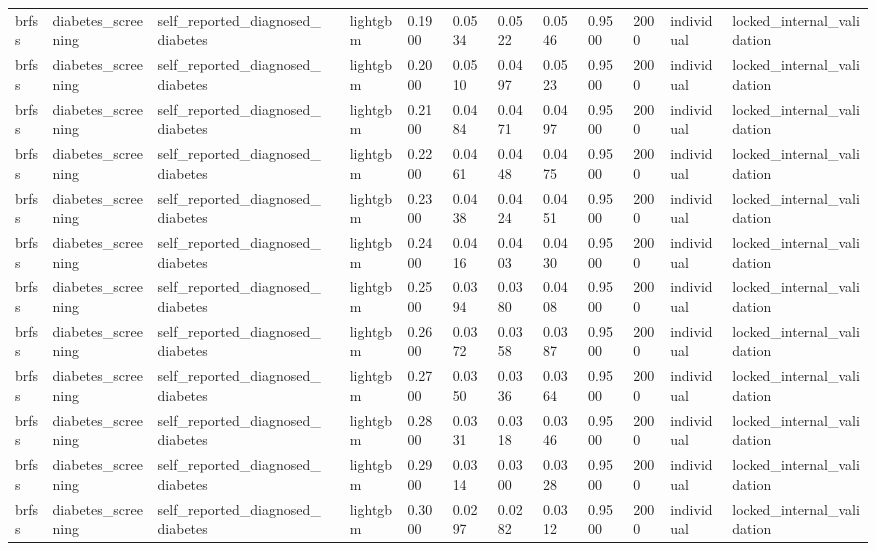 \begin{tabular}{lllllllllllll}
brfss & diabetes\_screening & self\_reported\_diagnosed\_diabetes &  & lightgbm & 0.1900 & 0.0534 & 0.0522 & 0.0546 & 0.9500 & 2000 & individual & locked\_internal\_validation \\
brfss & diabetes\_screening & self\_reported\_diagnosed\_diabetes &  & lightgbm & 0.2000 & 0.0510 & 0.0497 & 0.0523 & 0.9500 & 2000 & individual & locked\_internal\_validation \\
brfss & diabetes\_screening & self\_reported\_diagnosed\_diabetes &  & lightgbm & 0.2100 & 0.0484 & 0.0471 & 0.0497 & 0.9500 & 2000 & individual & locked\_internal\_validation \\
brfss & diabetes\_screening & self\_reported\_diagnosed\_diabetes &  & lightgbm & 0.2200 & 0.0461 & 0.0448 & 0.0475 & 0.9500 & 2000 & individual & locked\_internal\_validation \\
brfss & diabetes\_screening & self\_reported\_diagnosed\_diabetes &  & lightgbm & 0.2300 & 0.0438 & 0.0424 & 0.0451 & 0.9500 & 2000 & individual & locked\_internal\_validation \\
brfss & diabetes\_screening & self\_reported\_diagnosed\_diabetes &  & lightgbm & 0.2400 & 0.0416 & 0.0403 & 0.0430 & 0.9500 & 2000 & individual & locked\_internal\_validation \\
brfss & diabetes\_screening & self\_reported\_diagnosed\_diabetes &  & lightgbm & 0.2500 & 0.0394 & 0.0380 & 0.0408 & 0.9500 & 2000 & individual & locked\_internal\_validation \\
brfss & diabetes\_screening & self\_reported\_diagnosed\_diabetes &  & lightgbm & 0.2600 & 0.0372 & 0.0358 & 0.0387 & 0.9500 & 2000 & individual & locked\_internal\_validation \\
brfss & diabetes\_screening & self\_reported\_diagnosed\_diabetes &  & lightgbm & 0.2700 & 0.0350 & 0.0336 & 0.0364 & 0.9500 & 2000 & individual & locked\_internal\_validation \\
brfss & diabetes\_screening & self\_reported\_diagnosed\_diabetes &  & lightgbm & 0.2800 & 0.0331 & 0.0318 & 0.0346 & 0.9500 & 2000 & individual & locked\_internal\_validation \\
brfss & diabetes\_screening & self\_reported\_diagnosed\_diabetes &  & lightgbm & 0.2900 & 0.0314 & 0.0300 & 0.0328 & 0.9500 & 2000 & individual & locked\_internal\_validation \\
brfss & diabetes\_screening & self\_reported\_diagnosed\_diabetes &  & lightgbm & 0.3000 & 0.0297 & 0.0282 & 0.0312 & 0.9500 & 2000 & individual & locked\_internal\_validation \\

\end{tabular}
